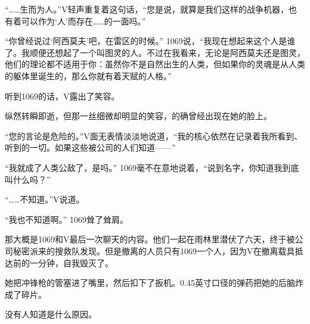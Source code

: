 “……生而为人。”V轻声重复着这句话，“您是说，就算是我们这样的战争机器，也有着可以作为‘人’而存在……的一面吗。”

“你曾经说过‘阿西莫夫’吧，在雷区的时候。” 1069说，“我现在想起来这个人是谁了。我顺便还想起了一个叫图灵的人。不过在我看来，无论是阿西莫夫还是图灵，他们的理论都不适用于你：虽然你不是自然出生的人类，但如果你的灵魂是从人类的躯体里诞生的，那么你就有着天赋的人格。”

听到1069的话，V露出了笑容。

纵然转瞬即逝，但那一丝细微却明显的笑容，的确曾经出现在她的脸上。

“您的言论是危险的。”V面无表情淡淡地说道，“我的核心依然在记录着我所看到、听到的一切。如果这些被公司的人们知道——”

“我就成了人类公敌了，是吗。” 1069毫不在意地说着，“说到名字，你知道我到底叫什么吗？”

“……不知道。”V说道。

“我也不知道啊。” 1069耸了耸肩。

那大概是1069和V最后一次聊天的内容。他们一起在雨林里潜伏了六天，终于被公司秘密派来的搜救队发现。但是撤离的人员只有1069一个人，因为V在撤离载具抵达前的一分钟，自我毁灭了。

她把冲锋枪的管塞进了嘴里，然后扣下了扳机。0.45英寸口径的弹药把她的后脑炸成了碎片。

没有人知道是什么原因。

